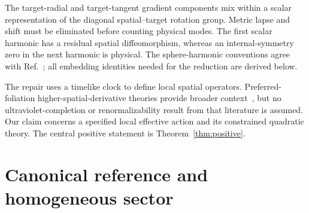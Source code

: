 \documentclass[11pt]{article}
\numberwithin{equation}{section}
\begin{document}
The target-radial and target-tangent gradient components mix within a scalar representation of the diagonal spatial--target rotation group.
Metric lapse and shift must be eliminated before counting physical modes.
The first scalar harmonic has a residual spatial diffeomorphism, whereas an internal-symmetry zero in the next harmonic is physical.
The sphere-harmonic conventions agree with Ref.~\cite{harmonics}; all embedding identities needed for the reduction are derived below.

The repair uses a timelike clock to define local spatial operators.
Preferred-foliation higher-spatial-derivative theories provide broader context~\cite{horava}, but no ultraviolet-completion or renormalizability result from that literature is assumed.
Our claim concerns a specified local effective action and its constrained quadratic theory.
The central positive statement is Theorem~\ref{thm:positive}.

\section{Canonical reference and homogeneous sector}
\label{sec:background}
\end{document}
